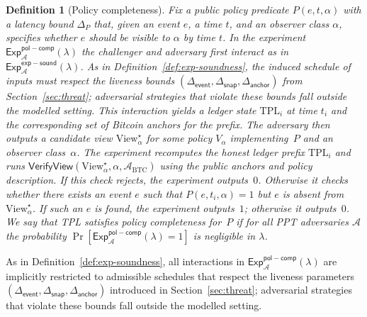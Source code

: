 \documentclass[11pt]{article}
\newtheorem{definition}{Definition}
\begin{document}
\begin{definition}[Policy completeness]
\label{def:policy-completeness}
Fix a public policy predicate $P(e,t,\alpha)$ with a latency bound $\Delta_P$ that, given an event $e$, a time $t$, and an observer class $\alpha$, specifies whether $e$ should be visible to $\alpha$ by time $t$.
In the experiment $\mathsf{Exp}^{\mathsf{pol-comp}}_{\mathcal{A}}(\lambda)$
the challenger and adversary first interact as in
$\mathsf{Exp}^{\mathsf{exp-sound}}_{\mathcal{A}}(\lambda)$.
As in Definition~\ref{def:exp-soundness}, the induced schedule of inputs must respect the
liveness bounds $(\Delta_{\mathsf{event}},\Delta_{\mathsf{snap}},\Delta_{\mathsf{anchor}})$
from Section~\ref{sec:threat}; adversarial strategies that violate these bounds fall
outside the modelled setting. This interaction yields a ledger
state $\mathrm{TPL}_i$ at time $t_i$ and the corresponding set of Bitcoin anchors for the prefix.
The adversary then outputs a candidate view $\mathrm{View}^\star_\alpha$ for some
policy $V_\alpha$ implementing~$P$ and an observer class~$\alpha$.
The experiment recomputes the honest ledger prefix $\mathrm{TPL}_i$ and runs
$\mathsf{VerifyView}(\mathrm{View}^\star_\alpha,\alpha,\mathcal{A}_{\mathrm{BTC}})$
using the public anchors and policy description.
If this check rejects, the experiment outputs~$0$.
Otherwise it checks whether there exists an event $e$ such that $P(e,t_i,\alpha)=1$ but
$e$ is absent from $\mathrm{View}^\star_\alpha$.
If such an $e$ is found, the experiment outputs~$1$; otherwise it outputs~$0$.
We say that TPL satisfies \emph{policy completeness} for~$P$ if for all PPT
adversaries $\mathcal{A}$ the probability
$\Pr[\mathsf{Exp}^{\mathsf{pol-comp}}_{\mathcal{A}}(\lambda)=1]$
is negligible in $\lambda$.
\end{definition}

As in Definition~\ref{def:exp-soundness}, all interactions in $\mathsf{Exp}^{\mathsf{pol-comp}}_{\mathcal{A}}(\lambda)$
are implicitly restricted to admissible schedules that respect the liveness parameters
$(\Delta_{\mathsf{event}},\Delta_{\mathsf{snap}},\Delta_{\mathsf{anchor}})$ introduced in Section~\ref{sec:threat};
adversarial strategies that violate these bounds fall outside the modelled setting.
\end{document}
